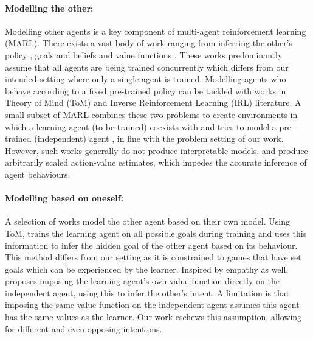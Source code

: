 
\paragraph{Modelling the other:} Modelling other agents is a key component of multi-agent reinforcement learning (MARL). There exists a vast body of work ranging from inferring the other's policy \cite{foerster:aamas18,wen2019probabilistic,hu2020other,shu2018m}, goals and beliefs \cite{Raileanu2018ModelingOU,moreno2021neural} and value functions \cite{zhao2022mcmarl,pmlr-v48-he16}. These works predominantly assume that all agents are being trained concurrently which differs from our intended setting where only a single agent is trained. Modelling agents who behave according to a fixed pre-trained policy can be tackled with works in Theory of Mind (ToM) \cite{pmlr-v80-rabinowitz18a} and Inverse Reinforcement Learning (IRL) \cite{ng2000algorithms} literature. A small subset of MARL combines these two problems to create environments in which a learning agent (to be trained) coexists with and tries to model a pre-trained (independent) agent \cite{papoudakis2021agent,SympathyPaper}, in line with the problem setting of our work. However, such works generally do not produce interpretable models, and produce arbitrarily scaled action-value estimates, which impedes the accurate inference of agent behaviours.%

\paragraph{Modelling based on oneself:} A selection of works model the other agent based on their own model. Using ToM, \cite{Raileanu2018ModelingOU} trains the learning agent on all possible goals during training and uses this information to infer the hidden goal of the other agent based on its behaviour. This method differs from our setting as it is constrained to games that have set goals which can be experienced by the learner. Inspired by empathy as well, \cite{TowardsEmpathicDQN} proposes 
imposing the learning agent's own value function directly on the independent agent, using this to infer the other's intent. A limitation is that imposing the same value function on the independent agent assumes this agent has the same values as the learner. Our work eschews this assumption, allowing for different and even opposing intentions. 

